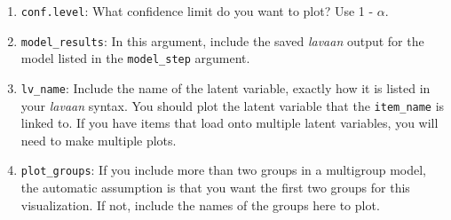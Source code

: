 \documentclass[
  man]{apa7}
\newenvironment{Shaded}{\begin{snugshade}}{\end{snugshade}}
\newcommand{\AttributeTok}[1]{\textcolor[rgb]{0.13,0.29,0.53}{#1}}
\newcommand{\CommentTok}[1]{\textcolor[rgb]{0.56,0.35,0.01}{\textit{#1}}}
\newcommand{\DecValTok}[1]{\textcolor[rgb]{0.00,0.00,0.81}{#1}}
\newcommand{\FunctionTok}[1]{\textcolor[rgb]{0.13,0.29,0.53}{\textbf{#1}}}
\newcommand{\NormalTok}[1]{#1}
\newcommand{\OtherTok}[1]{\textcolor[rgb]{0.56,0.35,0.01}{#1}}
\newcommand{\SpecialCharTok}[1]{\textcolor[rgb]{0.81,0.36,0.00}{\textbf{#1}}}
\newcommand{\StringTok}[1]{\textcolor[rgb]{0.31,0.60,0.02}{#1}}
\begin{document}
\begin{enumerate}
\item
  \texttt{conf.level}: What confidence limit do you want to plot? Use 1 - \(\alpha\).
\item
  \texttt{model\_results}: In this argument, include the saved \emph{lavaan} output for the model listed in the \texttt{model\_step} argument.
\item
  \texttt{lv\_name}: Include the name of the latent variable, exactly how it is listed in your \emph{lavaan} syntax. You should plot the latent variable that the \texttt{item\_name} is linked to. If you have items that load onto multiple latent variables, you will need to make multiple plots.
\item
  \texttt{plot\_groups}: If you include more than two groups in a multigroup model, the automatic assumption is that you want the first two groups for this visualization. If not, include the names of the groups here to plot.
\end{enumerate}

\small

\begin{Shaded}
\end{Shaded}
\end{document}
